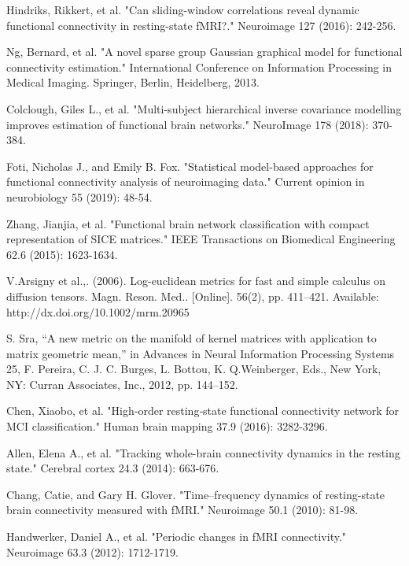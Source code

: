 \documentclass[preprint,12pt]{elsarticle}
\begin{document}
\begin{thebibliography}{1}
		Hindriks, Rikkert, et al. "Can sliding-window correlations reveal dynamic functional connectivity in resting-state fMRI?." Neuroimage 127 (2016): 242-256.
		
		Ng, Bernard, et al. "A novel sparse group Gaussian graphical model for functional connectivity estimation." International Conference on Information Processing in Medical Imaging. Springer, Berlin, Heidelberg, 2013.
		
		
		
		Colclough, Giles L., et al. "Multi-subject hierarchical inverse covariance modelling improves estimation of functional brain networks." NeuroImage 178 (2018): 370-384.
		
			Foti, Nicholas J., and Emily B. Fox. "Statistical model-based approaches for functional connectivity analysis of neuroimaging data." Current opinion in neurobiology 55 (2019): 48-54.	
		
		
		
		Zhang, Jianjia, et al. "Functional brain network classification with compact representation of SICE matrices." IEEE Transactions on Biomedical Engineering 62.6 (2015): 1623-1634.
		
		
		
		
		V.Arsigny et al.,. (2006). Log-euclidean metrics for fast and simple calculus
		on diffusion tensors. Magn. Reson. Med.. [Online]. 56(2), pp. 411–421.
		Available: http://dx.doi.org/10.1002/mrm.20965
		
		S. Sra, “A new metric on the manifold of kernel matrices with application
		to matrix geometric mean,” in Advances in Neural Information Processing
		Systems 25, F. Pereira, C. J. C. Burges, L. Bottou, K. Q.Weinberger, Eds.,
		New York, NY: Curran Associates, Inc., 2012, pp. 144–152.
		
		Chen, Xiaobo, et al. "High‐order resting‐state functional connectivity network for MCI classification." Human brain mapping 37.9 (2016): 3282-3296.
		
		Allen, Elena A., et al. "Tracking whole-brain connectivity dynamics in the resting state." Cerebral cortex 24.3 (2014): 663-676.
		
		Chang, Catie, and Gary H. Glover. "Time–frequency dynamics of resting-state brain connectivity measured with fMRI." Neuroimage 50.1 (2010): 81-98.
		
		Handwerker, Daniel A., et al. "Periodic changes in fMRI connectivity." Neuroimage 63.3 (2012): 1712-1719.
		

\end{thebibliography}
\end{document}
